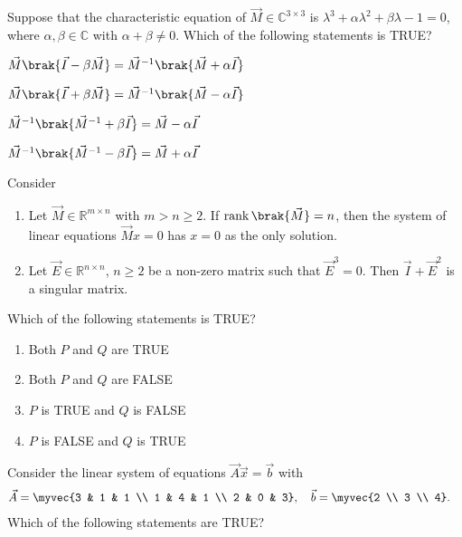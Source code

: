 \item Suppose that the characteristic equation of $\vec{M} \in \mathbb{C}^{3\times 3}$ is $\lambda^{3} + \alpha \lambda^{2} + \beta \lambda - 1 = 0$, where $\alpha, \beta \in \mathbb{C}$ with $\alpha + \beta \ne 0$. Which of the following statements is TRUE?
\hfill{}
\begin{enumerate}
\begin{multicols}{2}
  \item $\vec{M}\brak{\vec{I} - \beta \vec{M}} = \vec{M}^{-1}\brak{\vec{M} + \alpha \vec{I}}$
\item $\vec{M}\brak{\vec{I} + \beta \vec{M}} = \vec{M}^{-1}\brak{\vec{M} - \alpha \vec{I}}$
\item $\vec{M}^{-1}\brak{\vec{M}^{-1} + \beta \vec{I}} = \vec{M} - \alpha \vec{I}$
\item $\vec{M}^{-1}\brak{\vec{M}^{-1} - \beta \vec{I}} = \vec{M} + \alpha \vec{I}$
\end{multicols}
\end{enumerate}
\item Consider
	\begin{enumerate}[label=\Alph*:,start=16]
		\item  Let $\vec{M} \in \mathbb{R}^{m\times n}$ with $m>n\ge 2$. If $\operatorname{rank}\brak{\vec{M}}=n$, then the system of linear equations $\vec{M}x=0$ has $x=0$ as the only solution.
\item  Let $\vec{E} \in \mathbb{R}^{n\times n}$, $n\ge 2$ be a non-zero matrix such that $\vec{E}^{3}=0$. Then $\vec{I}+\vec{E}^{2}$ is a singular matrix.
\end{enumerate}
Which of the following statements is TRUE?
\hfill{}
\begin{enumerate}
\item Both $P$ and $Q$ are TRUE
\item Both $P$ and $Q$ are FALSE
\item $P$ is TRUE and $Q$ is FALSE
\item $P$ is FALSE and $Q$ is TRUE
\end{enumerate}
\item Consider the linear system of equations $\vec{A}\vec{x}=\vec{b}$ with
\begin{align*}
\vec{A} &= \myvec{3 & 1 & 1 \\ 1 & 4 & 1 \\ 2 & 0 & 3}, \quad
\vec{b} = \myvec{2 \\ 3 \\ 4}.
\end{align*}
Which of the following statements are TRUE?

